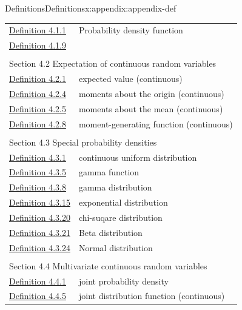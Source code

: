 \documentclass[oneside,10pt,]{book}
\begin{document}
\begin{appendixptx}{Definitions}{}{Definitions}{}{}{x:appendix:appendix-def}
\begin{longtable}[l]{ll}
\hyperref[x:definition:def-continuous-probability-density-3-2]{Definition 4.1.1}& Probability density function\\
\hyperref[x:definition:def-continuous-distribution-function-3-3]{Definition 4.1.9}& \\
\multicolumn{2}{l}{\null}\\[1.5ex] \multicolumn{2}{l}{\large Section 4.2 Expectation of continuous random variables}\\[0.5ex]
\hyperref[x:definition:def-expected-value-4-1-cont]{Definition 4.2.1}& expected value (continuous)\\
\hyperref[x:definition:def-moments-about-origin-4-2-cont]{Definition 4.2.4}& moments about the origin (continuous)\\
\hyperref[x:definition:def-moments-about-mean-4-4-cont]{Definition 4.2.5}& moments about the mean (continuous)\\
\hyperref[x:definition:def-mgf-4-6-cont]{Definition 4.2.8}& moment-generating function (continuous)\\
\multicolumn{2}{l}{\null}\\[1.5ex] \multicolumn{2}{l}{\large Section 4.3 Special probability densities}\\[0.5ex]
\hyperref[x:definition:def-cont-unif]{Definition 4.3.1}& continuous uniform distribution\\
\hyperref[x:definition:def-gamma-func]{Definition 4.3.5}& gamma function\\
\hyperref[x:definition:def-cont-gamma]{Definition 4.3.8}& gamma distribution\\
\hyperref[x:definition:def-cont-exp]{Definition 4.3.15}& exponential distribution\\
\hyperref[x:definition:def-cont-chi]{Definition 4.3.20}& chi-suqare distribution\\
\hyperref[x:definition:def-cont-beta]{Definition 4.3.21}& Beta distribution\\
\hyperref[x:definition:def-cont-normal]{Definition 4.3.24}& Normal distribution\\
\multicolumn{2}{l}{\null}\\[1.5ex] \multicolumn{2}{l}{\large Section 4.4 Multivariate continuous random variables}\\[0.5ex]
\hyperref[x:definition:def-joint-probability-density-3-6-cont]{Definition 4.4.1}& joint probability density\\
\hyperref[x:definition:def-joint-density-function-3-7-cont]{Definition 4.4.5}& joint distribution function (continuous)\\

\end{longtable}
\end{appendixptx}
\end{document}
